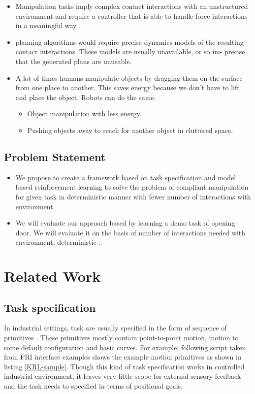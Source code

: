 \documentclass[thesis]{mas_proposal}
\begin{document}
\begin{itemize}
    \item Manipulation tasks imply complex contact interactions with an unstructured environment and require a controller that is able to handle force interactions in a meaningful way \cite{kalakrishnan2011learning}.
    \item planning algorithms would require precise dynamics models of the resulting contact interactions. These models are usually unavailable, or so im- precise that the generated plans are unusable\cite{kalakrishnan2011learning}.
    \item A lot of times humans manipulate objects by dragging them on the surface from one place to another. This saves energy because we don't have to lift and place the object. Robots can do the same. 
    \begin{itemize}
    	\item Object manipulation with less energy.
    	\item Pushing objects away to reach for another object in cluttered space.
    \end{itemize}
\end{itemize}

\section{Problem Statement}
\begin{itemize}
    \item We propose to create a framework based on task specification and model based reinforcement learning to solve the problem of compliant manipulation for given task in deterministic manner with fewer number of interactions with environment.
    \item We will evaluate our approach based by learning a demo task of opening door. We will evaluate it on the basis of number of interactions needed with environment, deterministic .
\end{itemize}


\chapter{Related Work}
\section{Task specification}
In industrial settings, task are usually specified in the form of sequence of primitives \cite{leidner2017cognitive}. These primitives mostly contain point-to-point motion, motion to some default configuration and basic curves. For example, following script taken from FRI interface examples shows the example motion primitives as shown in listing \ref{KRL-sample}. Though this kind of task specification works in controlled industrial environment, it leaves very little scope for external sensory feedback and the task needs to specified in terms of positional goals.
\end{document}
